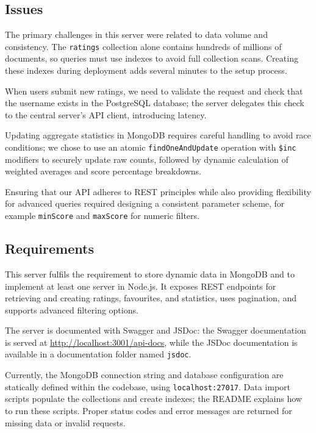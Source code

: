 \documentclass[12pt,a4paper]{article}
\begin{document}
\subsection{Issues}

The primary challenges in this server were related to data volume and consistency. The \texttt{ratings} collection alone contains hundreds of millions of documents, so queries must use indexes to avoid full collection scans. Creating these indexes during deployment adds several minutes to the setup process.

When users submit new ratings, we need to validate the request and check that the username exists in the PostgreSQL database; the server delegates this check to the central server's API client, introducing latency.

Updating aggregate statistics in MongoDB requires careful handling to avoid race conditions; we chose to use an atomic \texttt{findOneAndUpdate} operation with \texttt{\$inc} modifiers to securely update raw counts, followed by dynamic calculation of weighted averages and score percentage breakdowns.

Ensuring that our API adheres to REST principles while also providing flexibility for advanced queries required designing a consistent parameter scheme, for example \texttt{minScore} and \texttt{maxScore} for numeric filters.

\subsection{Requirements}

This server fulfils the requirement to store dynamic data in MongoDB and to implement at least one server in Node.js. It exposes REST endpoints for retrieving and creating ratings, favourites, and statistics, uses pagination, and supports advanced filtering options.

The server is documented with Swagger and JSDoc: the Swagger documentation is served at \url{http://localhost:3001/api-docs}, while the JSDoc documentation is available in a documentation folder named \texttt{jsdoc}.

Currently, the MongoDB connection string and database configuration are statically defined within the codebase, using \texttt{localhost:27017}. Data import scripts populate the collections and create indexes; the README explains how to run these scripts. Proper status codes and error messages are returned for missing data or invalid requests.
\end{document}
